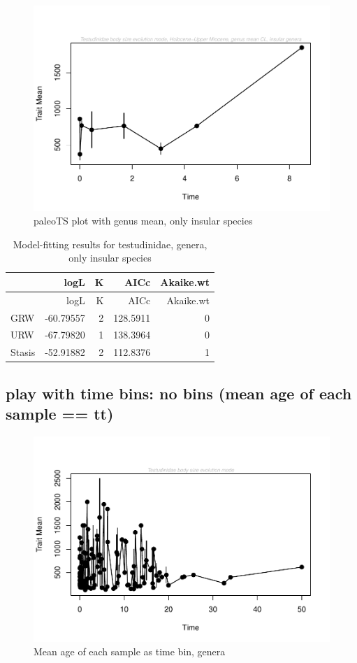 \documentclass[]{article}
\begin{document}
\begin{figure}[htbp]
\centering
\includegraphics{MA_JJ_files/figure-latex/paleoTS plot with genus mean, excluding continental species-1.pdf}
\caption{paleoTS plot with genus mean, only insular species}
\end{figure}

\begin{longtable}[]{@{}lrrrr@{}}
\caption{Model-fitting results for testudinidae, genera, only insular
species}\tabularnewline
\toprule
& logL & K & AICc & Akaike.wt\tabularnewline
\midrule
\endfirsthead
\toprule
& logL & K & AICc & Akaike.wt\tabularnewline
\midrule
\endhead
GRW & -60.79557 & 2 & 128.5911 & 0\tabularnewline
URW & -67.79820 & 1 & 138.3964 & 0\tabularnewline
Stasis & -52.91882 & 2 & 112.8376 & 1\tabularnewline
\bottomrule
\end{longtable}

\newpage

\subsection{play with time bins: no bins (mean age of each sample ==
tt)}\label{play-with-time-bins-no-bins-mean-age-of-each-sample-tt}

\begin{figure}[htbp]
\centering
\includegraphics{MA_JJ_files/figure-latex/paleoTS with different time bins, no bins, genera-1.pdf}
\caption{Mean age of each sample as time bin, genera}
\end{figure}
\end{document}
